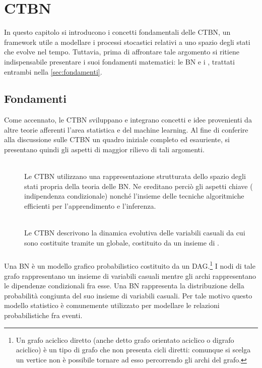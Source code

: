 
\chapter{\texorpdfstring{CTBN}{\ctbn{}}}
\label{cap:ctbn}
\acresetall
In questo capitolo si introducono i concetti fondamentali delle \ac{CTBN}, un framework utile a modellare i processi stocastici relativi a uno spazio degli stati che evolve nel tempo.
Tuttavia, prima di affrontare tale argomento si ritiene indispensabile presentare i suoi fondamenti matematici: le \ac{BN} e i \mprocess{}, trattati entrambi nella \autoref{sec:fondamenti}.

\section{Fondamenti}
\label{sec:fondamenti}
Come accennato, le \acl{CTBN} sviluppano e integrano concetti e idee provenienti da altre teorie afferenti l'area statistica e del machine learning. Al fine di conferire alla discussione sulle \acs{CTBN} un quadro iniziale completo ed esauriente, si presentano quindi gli aspetti di maggior rilievo di tali argomenti.
\begin{description}
\item[\bn{}] \hfill \\
Le \acl{CTBN} utilizzano una rappresentazione strutturata dello spazio degli stati propria della teoria delle \acl{BN}. Ne ereditano perciò gli aspetti chiave (\eg{} indipendenza condizionale) nonché l'insieme delle tecniche algoritmiche efficienti per l'apprendimento e l'inferenza.
\item[\mprocess{}] \hfill \\
Le \acl{CTBN} descrivono la dinamica evolutiva delle variabili casuali da cui sono costituite tramite un \omprocess{} globale, costituito da un insieme di \cmprocess{}.
\end{description} 

\subsection{\bn{}}
\label{sec:bns}
Una \acl{BN} è un modello grafico probabilistico costituito da un \acf{DAG}.\footnote{Un grafo aciclico diretto (anche detto grafo orientato aciclico o digrafo aciclico) è un tipo di grafo che non presenta cicli diretti: comunque si scelga un vertice non è possibile tornare ad esso percorrendo gli archi del grafo.} I nodi di tale grafo rappresentano un insieme di variabili casuali mentre gli archi rappresentano le dipendenze condizionali fra esse. Una \acs{BN} rappresenta la distribuzione della probabilità congiunta del suo insieme di variabili casuali. Per tale motivo questo modello statistico è comunemente utilizzato per modellare le relazioni probabilistiche fra eventi.

